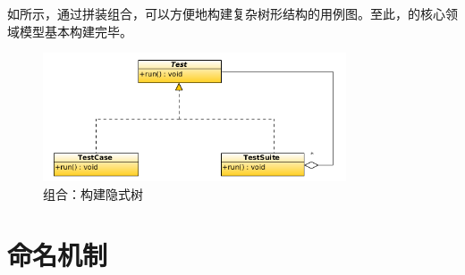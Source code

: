 \begin{content}
如所示，通过拼装组合，可以方便地构建复杂树形结构的用例图。至此，的核心领域模型基本构建完毕。

\begin{figure}
\centering
\includegraphics[width=0.8\textwidth]{figures/xunit/test-tree.png}
\caption{组合：构建隐式树}
 \label{fig:test-tree}
\end{figure}

\end{content}

\section{命名机制}

